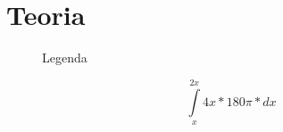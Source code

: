 \section{Teoria}
\lipsum[1]
\begin{center}
	\begin{figure}[h]
		\caption{Legenda}
		\label{fig:placeholder.jpg}
	\end{figure}
	\begin{equation}
	\int\limits_{x}^{2x} 4x*180\pi*dx
	\end{equation}
\end{center}